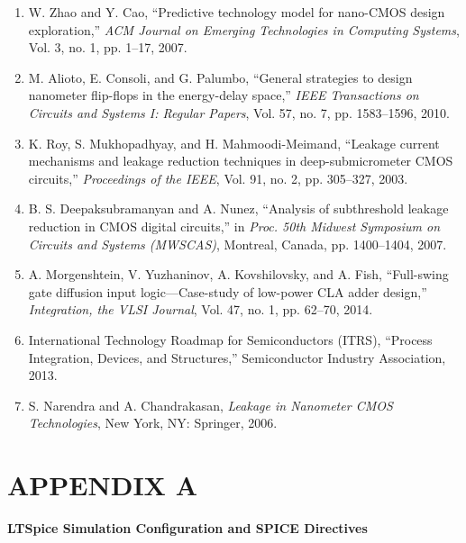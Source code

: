 \documentclass[12pt,a4paper,oneside]{report}
\begin{document}
\begin{enumerate}
\item[{[10]}] W. Zhao and Y. Cao, ``Predictive technology model for nano-CMOS design exploration,'' \textit{ACM Journal on Emerging Technologies in Computing Systems}, Vol. 3, no. 1, pp. 1--17, 2007.

\item[{[11]}] M. Alioto, E. Consoli, and G. Palumbo, ``General strategies to design nanometer flip-flops in the energy-delay space,'' \textit{IEEE Transactions on Circuits and Systems I: Regular Papers}, Vol. 57, no. 7, pp. 1583--1596, 2010.

\item[{[12]}] K. Roy, S. Mukhopadhyay, and H. Mahmoodi-Meimand, ``Leakage current mechanisms and leakage reduction techniques in deep-submicrometer CMOS circuits,'' \textit{Proceedings of the IEEE}, Vol. 91, no. 2, pp. 305--327, 2003.

\item[{[13]}] B. S. Deepaksubramanyan and A. Nunez, ``Analysis of subthreshold leakage reduction in CMOS digital circuits,'' in \textit{Proc. 50th Midwest Symposium on Circuits and Systems (MWSCAS)}, Montreal, Canada, pp. 1400--1404, 2007.

\item[{[14]}] A. Morgenshtein, V. Yuzhaninov, A. Kovshilovsky, and A. Fish, ``Full-swing gate diffusion input logic---Case-study of low-power CLA adder design,'' \textit{Integration, the VLSI Journal}, Vol. 47, no. 1, pp. 62--70, 2014.

\item[{[15]}] International Technology Roadmap for Semiconductors (ITRS), ``Process Integration, Devices, and Structures,'' Semiconductor Industry Association, 2013.

\item[{[16]}] S. Narendra and A. Chandrakasan, \textit{Leakage in Nanometer CMOS Technologies}, New York, NY: Springer, 2006.
\end{enumerate}


\clearpage
\chapter*{APPENDIX A}

\noindent\textbf{LTSpice Simulation Configuration and SPICE Directives}
\end{document}
